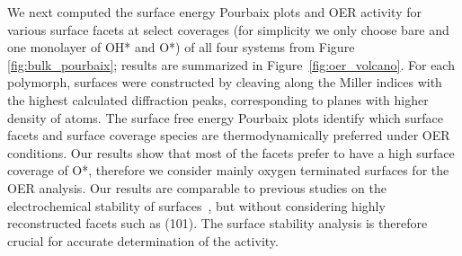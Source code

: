 %
%
We next computed the surface energy Pourbaix plots and OER activity for various surface facets at select coverages (for simplicity we only choose bare and one monolayer of OH* and O*) of all four systems from Figure \ref{fig:bulk_pourbaix};
results are summarized in Figure~\ref{fig:oer_volcano}.
%
For each polymorph, surfaces were constructed by cleaving along the Miller indices with the highest calculated diffraction peaks, corresponding to planes with higher density of atoms.
%
The surface free energy Pourbaix plots identify which surface facets and surface coverage species are thermodynamically preferred under OER conditions.
%
Our results show that most of the facets prefer to have a high surface coverage of O*, therefore we consider mainly oxygen terminated surfaces for the OER analysis.
%
Our results are comparable to previous studies on the electrochemical stability of \IrOtwo surfaces~\cite{Nattino2019,Raman2020},
but without considering highly reconstructed facets such as (101).
%
The surface stability analysis is therefore crucial for accurate determination of the activity.



